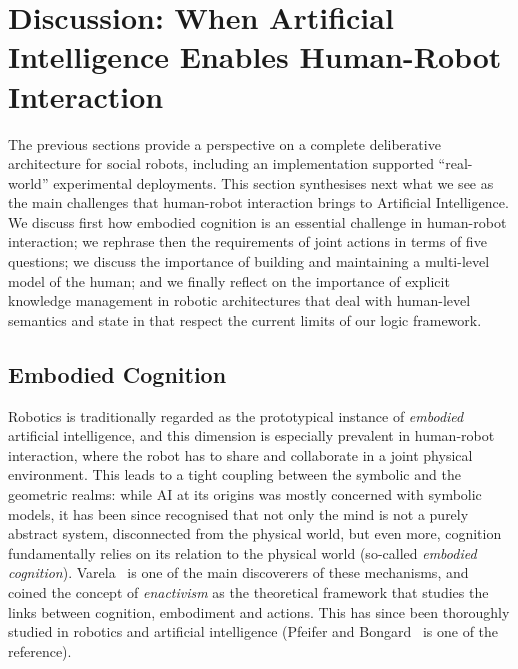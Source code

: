 \documentclass[preprint,3p,times]{elsarticle}
\begin{document}


\section{Discussion: When Artificial Intelligence Enables Human-Robot
Interaction}
\label{sect|discussion}

The previous sections provide a perspective on a complete deliberative
architecture for social robots, including an implementation supported
``real-world'' experimental deployments. This section synthesises next what we
see as the main challenges that human-robot interaction brings to Artificial
Intelligence.  We discuss first how embodied cognition is an essential challenge
in human-robot interaction; we rephrase then the requirements of joint actions
in terms of five questions; we discuss the importance of building and
maintaining a multi-level model of the human; and we finally reflect on the
importance of explicit knowledge management in robotic architectures that deal
with human-level semantics and state in that respect the current limits of our
logic framework.

\subsection{Embodied Cognition}

Robotics is traditionally regarded as the prototypical instance of
\emph{embodied} artificial intelligence, and this dimension is especially
prevalent in human-robot interaction, where the robot has to share and
collaborate in a joint physical environment.  This leads to a tight coupling
between the symbolic and the geometric realms: while AI at its origins was
mostly concerned with symbolic models, it has been since recognised that not
only the mind is not a purely abstract system, disconnected from the physical
world, but even more, cognition fundamentally relies on its relation to the
physical world (so-called \emph{embodied cognition}). Varela~\cite{Varela1992}
is one of the main discoverers of these mechanisms, and coined the concept of
\emph{enactivism} as the theoretical framework that studies the links between
cognition, embodiment and actions.  This has since been thoroughly studied in
robotics and artificial intelligence (Pfeifer and
Bongard~\cite{pfeifer2007body} is one of the reference).
\end{document}
